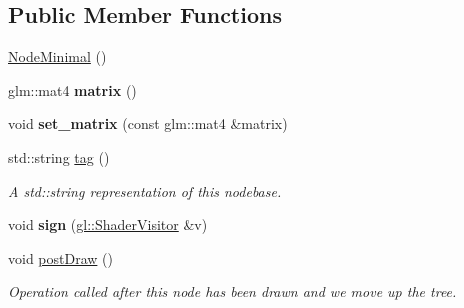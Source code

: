 \subsection*{Public Member Functions}
\begin{DoxyCompactItemize}
\item 
\hyperlink{classs9_1_1NodeMinimal_a80572ab845ddfd90f879333f4020d67e}{Node\-Minimal} ()
\item 
\hypertarget{classs9_1_1NodeMinimal_a8a29e473cbffd855734656c64edb6c10}{glm\-::mat4 {\bfseries matrix} ()}\label{classs9_1_1NodeMinimal_a8a29e473cbffd855734656c64edb6c10}

\item 
\hypertarget{classs9_1_1NodeMinimal_adb49fa752a7b3e097cc0d4ef0cf9ea5a}{void {\bfseries set\-\_\-matrix} (const glm\-::mat4 \&matrix)}\label{classs9_1_1NodeMinimal_adb49fa752a7b3e097cc0d4ef0cf9ea5a}

\item 
\hypertarget{classs9_1_1NodeMinimal_ab44c04fc5747124b87394080d576307b}{std\-::string \hyperlink{classs9_1_1NodeMinimal_ab44c04fc5747124b87394080d576307b}{tag} ()}\label{classs9_1_1NodeMinimal_ab44c04fc5747124b87394080d576307b}

\begin{DoxyCompactList}\small\item\em A std\-::string representation of this nodebase. \end{DoxyCompactList}\item 
\hypertarget{classs9_1_1NodeMinimal_ab5a97aab7bbcab80e7e846442aad9144}{void {\bfseries sign} (\hyperlink{classs9_1_1gl_1_1ShaderVisitor}{gl\-::\-Shader\-Visitor} \&v)}\label{classs9_1_1NodeMinimal_ab5a97aab7bbcab80e7e846442aad9144}

\item 
\hypertarget{classs9_1_1NodeMinimal_afc711929cd17f423d9a58b5f3d74202c}{void \hyperlink{classs9_1_1NodeMinimal_afc711929cd17f423d9a58b5f3d74202c}{post\-Draw} ()}\label{classs9_1_1NodeMinimal_afc711929cd17f423d9a58b5f3d74202c}

\begin{DoxyCompactList}\small\item\em Operation called after this node has been drawn and we move up the tree. \end{DoxyCompactList}\end{DoxyCompactItemize}
